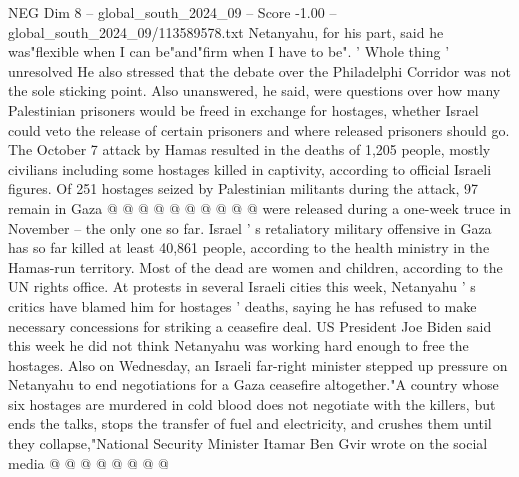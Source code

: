 \begin{textsample}{NEG Dim 8 – global\_south\_2024\_09 – Score -1.00 – global\_south\_2024\_09/113589578.txt}
Netanyahu, for his part, said he was"flexible when I can be"and"firm when I have to be". ' Whole thing ' unresolved He also stressed that the debate over the Philadelphi Corridor was not the sole sticking point.
Also unanswered, he said, were questions over how many Palestinian prisoners would be freed in exchange for hostages, whether Israel could veto the release of certain prisoners and where released prisoners should go.
The October 7 attack by Hamas resulted in the deaths of 1,205 people, mostly civilians including some hostages killed in captivity, according to official Israeli figures.
Of 251 hostages seized by Palestinian militants during the attack, 97 remain in Gaza @ @ @ @ @ @ @ @ @ @ were released during a one-week truce in November -- the only one so far.
Israel ' s retaliatory military offensive in Gaza has so far killed at least 40,861 people, according to the health ministry in the Hamas-run territory.
Most of the dead are women and children, according to the UN rights office.
At protests in several Israeli cities this week, Netanyahu ' s critics have blamed him for hostages ' deaths, saying he has refused to make necessary concessions for striking a ceasefire deal.
US President Joe Biden said this week he did not think Netanyahu was working hard enough to free the hostages.
Also on Wednesday, an Israeli far-right minister stepped up pressure on Netanyahu to end negotiations for a Gaza ceasefire altogether."A country whose six hostages are murdered in cold blood does not negotiate with the killers, but ends the talks, stops the transfer of fuel and electricity, and crushes them until they collapse,"National Security Minister Itamar Ben Gvir wrote on the social media @ @ @ @ @ @ @ @

\end{textsample}
